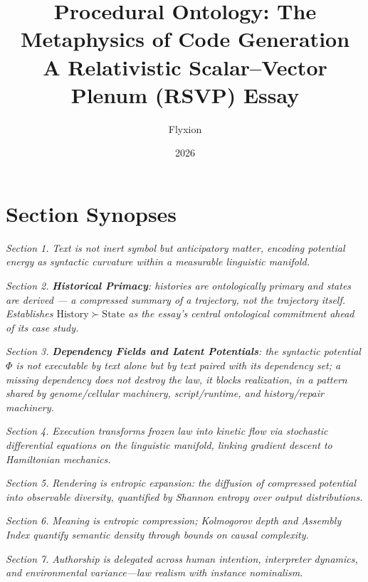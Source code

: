 \documentclass[12pt,a4paper]{article}
\title{\textbf{Procedural Ontology: The Metaphysics of Code Generation}\\
\large A Relativistic Scalar--Vector Plenum (RSVP) Essay}
\author{Flyxion}
\date{2026}
\theoremstyle{plain}
\theoremstyle{definition}
\theoremstyle{remark}
\newcommand{\Phifield}{\Phi}
\begin{document}
\maketitle

\section*{Section Synopses}

\textit{Section 1.} \textit{Text is not inert symbol but anticipatory matter, encoding potential energy as syntactic curvature within a measurable linguistic manifold.}

\textit{Section 2.} \textit{\textbf{Historical Primacy}: histories are ontologically primary and states are derived — a compressed summary of a trajectory, not the trajectory itself. Establishes $\mathrm{History} \succ \mathrm{State}$ as the essay's central ontological commitment ahead of its case study.}

\textit{Section 3.} \textit{\textbf{Dependency Fields and Latent Potentials}: the syntactic potential $\Phifield$ is not executable by text alone but by text paired with its dependency set; a missing dependency does not destroy the law, it blocks realization, in a pattern shared by genome/cellular machinery, script/runtime, and history/repair machinery.}

\textit{Section 4.} \textit{Execution transforms frozen law into kinetic flow via stochastic differential equations on the linguistic manifold, linking gradient descent to Hamiltonian mechanics.}

\textit{Section 5.} \textit{Rendering is entropic expansion: the diffusion of compressed potential into observable diversity, quantified by Shannon entropy over output distributions.}

\textit{Section 6.} \textit{Meaning is entropic compression; Kolmogorov depth and Assembly Index quantify semantic density through bounds on causal complexity.}

\textit{Section 7.} \textit{Authorship is delegated across human intention, interpreter dynamics, and environmental variance—law realism with instance nominalism.}
\end{document}

